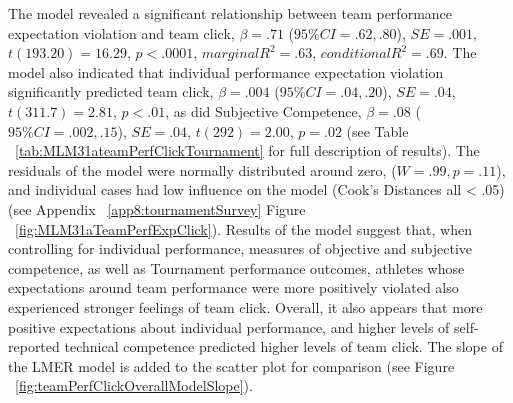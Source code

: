 \begin{CJK}{UTF8}{gbsn}
     \bigskip

The model revealed a significant relationship between team performance expectation violation and team click, $\beta = .71$ ($95\% CI = .62, .80$), $SE = .001$, $t(193.20) = 16.29$, $p < .0001$, $marginal R^2 = .63$, $conditional R^2 = .69$.
The model also indicated that individual performance expectation violation significantly predicted team click, $\beta = .004$ ($95\% CI =  .04, .20$), $SE = .04$, $t(311.7) = 2.81$, $p < .01$, as did Subjective Competence, $\beta = .08$ ($95\% CI =  .002, .15$), $SE = .04$, $t(292) = 2.00$, $p = .02$  (see Table ~\ref{tab:MLM31ateamPerfClickTournament} for full description of results).
The residuals of the model were normally distributed around zero, ($W = .99, p = .11$), and individual cases had low influence on the model (Cook's Distances all < .05) (see Appendix ~\ref{app8:tournamentSurvey} Figure ~\ref{fig:MLM31aTeamPerfExpClick}).
Results of the model suggest that, when controlling for individual performance, measures of objective and subjective competence, as well as Tournament performance outcomes, athletes whose expectations around team performance were more positively violated also experienced stronger feelings of team click. Overall, it also appears that more positive expectations about individual performance, and higher levels of self-reported technical competence predicted higher levels of team click.  The slope of the LMER model is added to the scatter plot for comparison (see Figure ~\ref{fig:teamPerfClickOverallModelSlope}).

   



\end{CJK}
